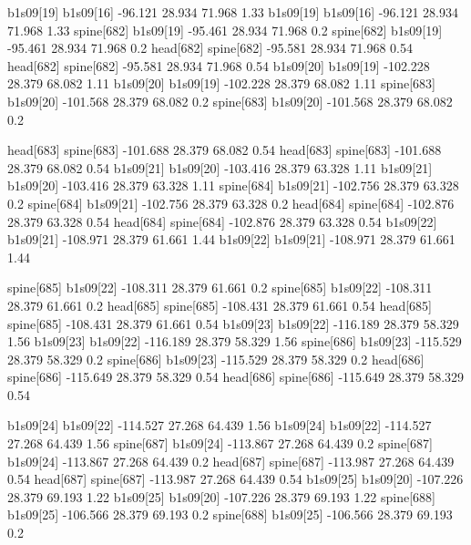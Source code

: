 b1s09[19]    b1s09[16]    -96.121    28.934    71.968    1.33
b1s09[19]    b1s09[16]    -96.121    28.934    71.968    1.33
spine[682]    b1s09[19]    -95.461    28.934    71.968    0.2
spine[682]    b1s09[19]    -95.461    28.934    71.968    0.2
head[682]    spine[682]    -95.581    28.934    71.968    0.54
head[682]    spine[682]    -95.581    28.934    71.968    0.54
b1s09[20]    b1s09[19]    -102.228    28.379    68.082    1.11
b1s09[20]    b1s09[19]    -102.228    28.379    68.082    1.11
spine[683]    b1s09[20]    -101.568    28.379    68.082    0.2
spine[683]    b1s09[20]    -101.568    28.379    68.082    0.2


head[683]    spine[683]    -101.688    28.379    68.082    0.54
head[683]    spine[683]    -101.688    28.379    68.082    0.54
b1s09[21]    b1s09[20]    -103.416    28.379    63.328    1.11
b1s09[21]    b1s09[20]    -103.416    28.379    63.328    1.11
spine[684]    b1s09[21]    -102.756    28.379    63.328    0.2
spine[684]    b1s09[21]    -102.756    28.379    63.328    0.2
head[684]    spine[684]    -102.876    28.379    63.328    0.54
head[684]    spine[684]    -102.876    28.379    63.328    0.54
b1s09[22]    b1s09[21]    -108.971    28.379    61.661    1.44
b1s09[22]    b1s09[21]    -108.971    28.379    61.661    1.44


spine[685]    b1s09[22]    -108.311    28.379    61.661    0.2
spine[685]    b1s09[22]    -108.311    28.379    61.661    0.2
head[685]    spine[685]    -108.431    28.379    61.661    0.54
head[685]    spine[685]    -108.431    28.379    61.661    0.54
b1s09[23]    b1s09[22]    -116.189    28.379    58.329    1.56
b1s09[23]    b1s09[22]    -116.189    28.379    58.329    1.56
spine[686]    b1s09[23]    -115.529    28.379    58.329    0.2
spine[686]    b1s09[23]    -115.529    28.379    58.329    0.2
head[686]    spine[686]    -115.649    28.379    58.329    0.54
head[686]    spine[686]    -115.649    28.379    58.329    0.54


b1s09[24]    b1s09[22]    -114.527    27.268    64.439    1.56
b1s09[24]    b1s09[22]    -114.527    27.268    64.439    1.56
spine[687]    b1s09[24]    -113.867    27.268    64.439    0.2
spine[687]    b1s09[24]    -113.867    27.268    64.439    0.2
head[687]    spine[687]    -113.987    27.268    64.439    0.54
head[687]    spine[687]    -113.987    27.268    64.439    0.54
b1s09[25]    b1s09[20]    -107.226    28.379    69.193    1.22
b1s09[25]    b1s09[20]    -107.226    28.379    69.193    1.22
spine[688]    b1s09[25]    -106.566    28.379    69.193    0.2
spine[688]    b1s09[25]    -106.566    28.379    69.193    0.2


